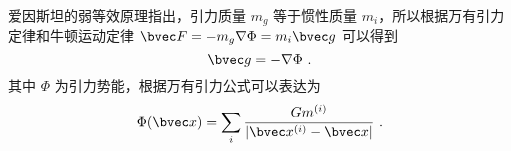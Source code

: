 

爱因斯坦的弱等效原理指出，引力质量 $m_g$ 等于惯性质量 $m_i$，所以根据万有引力定律和牛顿运动定律 $\bvec F=-m_g \nabla \Phi = m_i \bvec g$ 可以得到 
\begin{equation}
\bvec g = -\nabla\Phi~.
\end{equation}
其中 $\Phi$ 为引力势能，根据万有引力公式可以表达为
\begin{equation}
\Phi(\bvec x)=\sum_{i} \frac{G m^{(i)}}{|\bvec x^{(i)}-\bvec x|}~.
\end{equation}
